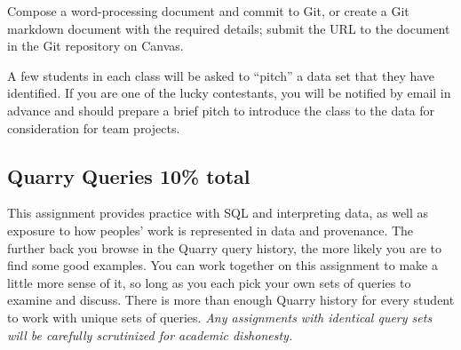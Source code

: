 \documentclass[11pt]{article}
\begin{document}
Compose a word-processing document and commit to Git, or create a Git markdown document with the required details; submit the URL to the document in the Git repository on Canvas.

A few students in each class will be asked to ``pitch'' a data set that they have identified.
If you are one of the lucky contestants, you will be notified by email in advance and should prepare a brief pitch to introduce the class to the data for consideration for team projects.



\subsection{Quarry Queries  10\% total}

This assignment provides practice with SQL and interpreting data, as well as exposure to how peoples' work is represented in data and provenance.
The further back you browse in the Quarry query history, the more likely you are to find some good examples.
You can work together on this assignment to make a little more sense of it, so long as you each pick your own sets of queries to examine and discuss.
There is more than enough Quarry history for every student to work with unique sets of queries.
\textit{Any assignments with identical query sets will be carefully scrutinized for academic dishonesty.}
\end{document}
